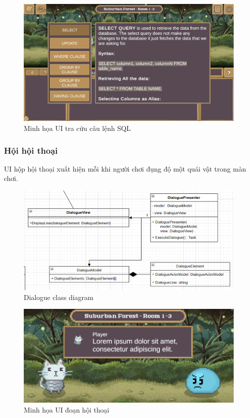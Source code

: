 \begin{figure}[H]
	\centering
	\includegraphics[width=13cm]{Images/DocumentationUI.png}
	\vspace{0.5cm}
	\caption{Minh họa UI tra cứu câu lệnh SQL}
\end{figure}

\subsubsection{Hội hội thoại}

UI hộp hội thoại xuất hiện mỗi khi người chơi đụng độ một quái vật trong màn chơi.

\begin{figure}[H]
	\centering
	\includegraphics[width=13cm]{Images/DialogueView.png}
	\vspace{0.5cm}
	\caption{Dialogue class diagram}
\end{figure}

\begin{figure}[H]
	\centering
	\includegraphics[width=13cm]{Images/DialogueUI.png}
	\vspace{0.5cm}
	\caption{Minh họa UI đoạn hội thoại}
\end{figure}

